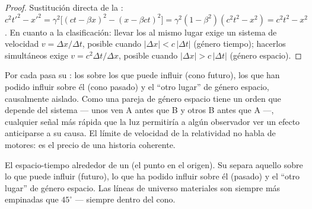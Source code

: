 \begin{proof}
Sustitución directa de la :
$c^2t'^2 - x'^2 = \gamma^2\big[(ct - \beta x)^2 - (x - \beta ct)^2
\big] = \gamma^2(1 - \beta^2)(c^2t^2 - x^2) = c^2t^2 - x^2$.
En cuanto a la clasificación: llevar los  al mismo lugar exige un
sistema de velocidad $v = \Delta x/\Delta t$, posible cuando $|\Delta x| <
c\,|\Delta t|$ (género tiempo); hacerlos simultáneos exige $v =
c^2\Delta t/\Delta x$, posible cuando $|\Delta x| > c\,|\Delta t|$
(género espacio).
\end{proof}

\begin{remark}\label{rem:b3:relativistic-kinematics:causality}
Por cada  pasa su \emph{}: los  sobre los que puede
influir (cono futuro), los que han podido influir sobre él (cono pasado) y
el ``otro lugar'' de género espacio, causalmente aislado. Como una pareja de
género espacio tiene un orden que depende del sistema --- unos ven A antes
que B y otros B antes que A ---, cualquier señal más rápida que la luz
permitiría a algún observador ver un efecto anticiparse a su causa. El
límite de velocidad de la relatividad no habla de motores: es el precio de
una historia coherente.
\end{remark}

\begin{omfigure}

{\small El espacio-tiempo alrededor de un  (el punto en el origen). Su
 separa aquello sobre lo que puede influir (futuro), lo que ha
podido influir sobre él (pasado) y el ``otro lugar'' de género espacio. Las
líneas de universo materiales son siempre más empinadas que $45^\circ$
--- siempre dentro del cono.}
\end{omfigure}

